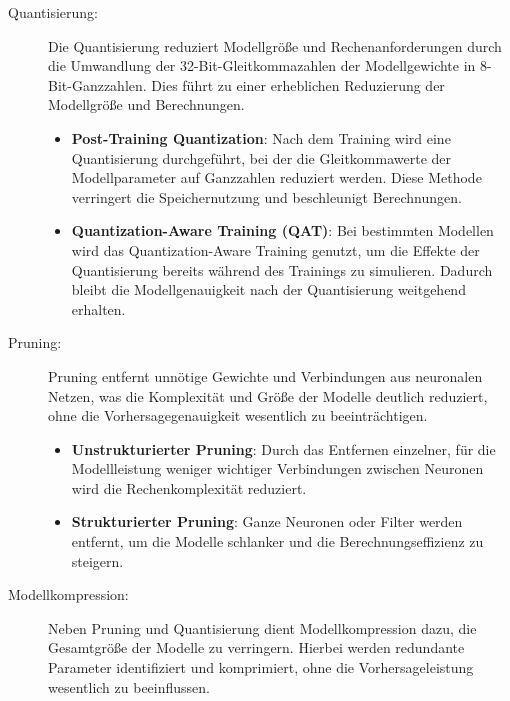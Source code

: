 \begin{description}
    \item[Quantisierung:] Die Quantisierung reduziert Modellgröße und Rechenanforderungen durch die Umwandlung der 32-Bit-Gleitkommazahlen der Modellgewichte 
    in 8-Bit-Ganzzahlen. Dies führt zu einer erheblichen Reduzierung der Modellgröße und Berechnungen.
    \begin{itemize}
        \item \textbf{Post-Training Quantization}: Nach dem Training wird eine Quantisierung durchgeführt, bei der die Gleitkommawerte der 
        Modellparameter auf Ganzzahlen reduziert werden. Diese Methode verringert die Speichernutzung und beschleunigt Berechnungen.
        \item \textbf{Quantization-Aware Training (QAT)}: Bei bestimmten Modellen wird das Quantization-Aware Training genutzt, 
        um die Effekte der Quantisierung bereits während des Trainings zu simulieren. Dadurch bleibt die Modellgenauigkeit nach der Quantisierung weitgehend erhalten.
    \end{itemize}

    \item[Pruning:] Pruning entfernt unnötige Gewichte und Verbindungen aus neuronalen Netzen, was die Komplexität und Größe der Modelle deutlich reduziert, 
    ohne die Vorhersagegenauigkeit wesentlich zu beeinträchtigen.
    \begin{itemize}
        \item \textbf{Unstrukturierter Pruning}: Durch das Entfernen einzelner, für die Modellleistung weniger wichtiger Verbindungen zwischen Neuronen wird die 
        Rechenkomplexität reduziert.
        \item \textbf{Strukturierter Pruning}: Ganze Neuronen oder Filter werden entfernt, um die Modelle schlanker und die Berechnungseffizienz zu steigern.
    \end{itemize}

    \item[Modellkompression:] Neben Pruning und Quantisierung dient Modellkompression dazu, die Gesamtgröße der Modelle zu verringern. 
    Hierbei werden redundante Parameter identifiziert und komprimiert, ohne die Vorhersageleistung wesentlich zu beeinflussen.


\end{description}
